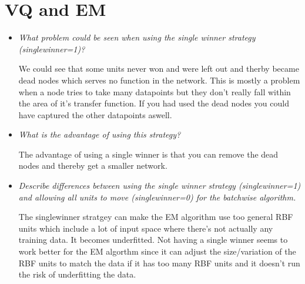 \documentclass[a4paper,11pt]{article}
\begin{document}
\section{VQ and EM}
\begin{itemize}

\item \textit{What problem could be seen when using the single winner strategy (singlewinner=1)?}

We could see that some units never won and were left out and therby became dead nodes which serves no function in the network. This is mostly a problem when a node tries to take many datapoints but they don't really fall within the area of it's transfer function. If you had used the dead nodes you could have captured the other datapoints aswell.

\begin{figure}[h!]
\label{fig4}
\caption{}
\end{figure}

\item \textit{What is the advantage of using this strategy?}

The advantage of using a single winner is that you can remove the dead nodes and thereby get a smaller network.

\item \textit{Describe differences between using the single winner strategy (singlewinner=1) and allowing all units to move (singlewinner=0) for the batchwise algorithm.}

The singlewinner stratgey can make the EM algorithm use too general RBF units which include a lot of input space where there's not actually any training data. It becomes underfitted. Not having a single winner seems to work better for the EM algorthm since it can adjust the size/variation of the RBF units to match the data if it has too many RBF units and it doesn't run the risk of underfitting the data.


\end{itemize}
\end{document}

